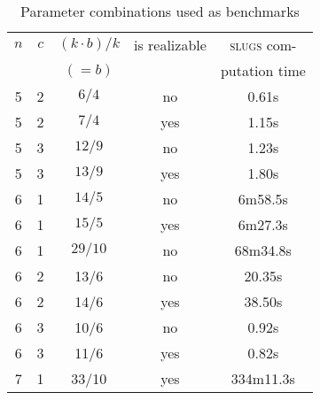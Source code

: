 \documentclass[a4paper,conference,10pt]{IEEEtran}
\begin{document}


%
\begin{table}[b]
\normalsize
\begin{center}
\begin{tabular}{c|c|c||c|c}
$n$ & $c$ & $(k \cdot b)/k$ & is realizable & \textsc{slugs} com- \\ & & $(=b)$ & & putation time\\ \hline \hline
5 & 2 & $6/{4}$ & no &	0.61s \\ \hline
5 & 2 & $7/{4}$ & yes & 1.15s \\ \hline
5 & 3 & $12/{9}$ & no & 1.23s \\ \hline
5 & 3 & $13/{9}$ & yes & 1.80s\\ \hline
6 & 1 & $14/{5}$ & no & 6m58.5s \\ \hline
6 & 1 & $15/{5}$ & yes & 6m27.3s \\ \hline
6 & 1 & $29/{10}$ & no & 68m34.8s \\ \hline
6 & 2 & 13/6 & no & 20.35s \\ \hline
6 & 2 & 14/6 & yes & 38.50s \\ \hline
6 & 3 & 10/6 & no & 0.92s\\ \hline
6 & 3 & 11/6 & yes & 0.82s \\ \hline
7 & 1 & 33/10 & yes & 334m11.3s
\end{tabular}
\end{center}
\caption{Parameter combinations used as benchmarks}
\label{tab:benchmarks}
\end{table}
\end{document}
